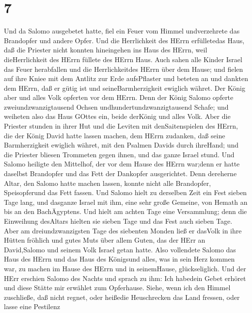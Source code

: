 \hypertarget{section-6}{%
\section{7}\label{section-6}}

 Und da Salomo ausgebetet hatte, fiel ein Feuer vom Himmel
undverzehrete das Brandopfer und andere Opfer. Und die Herrlichkeit des
HErrn erfülletedas Haus,  daß die Priester nicht konnten
hineingehen ins Haus des HErrn, weil dieHerrlichkeit des HErrn füllete
des HErrn Haus.  Auch sahen alle Kinder Israel das Feuer
herabfallen und die Herrlichkeitdes HErrn über dem Hause; und fielen auf
ihre Kniee mit dem Antlitz zur Erde aufsPflaster und beteten an und
dankten dem HErrn, daß er gütig ist und seineBarmherzigkeit ewiglich
währet.  Der König aber und alles Volk opferten vor dem
HErrn.  Denn der König Salomo opferte zweiundzwanzigtausend
Ochsen undhundertundzwanzigtausend Schafe; und weiheten also das Haus
GOttes ein, beide derKönig und alles Volk.  Aber die
Priester stunden in ihrer Hut und die Leviten mit denSaitenspielen des
HErrn, die der König David hatte lassen machen, dem HErrn zudanken, daß
seine Barmherzigkeit ewiglich währet, mit den Psalmen Davids durch
ihreHand; und die Priester bliesen Trommeten gegen ihnen, und das ganze
Israel stund.  Und Salomo heiligte den Mittelhof, der vor
dem Hause des HErrn war;denn er hatte daselbst Brandopfer und das Fett
der Dankopfer ausgerichtet. Denn dereherne Altar, den Salomo hatte
machen lassen, konnte nicht alle Brandopfer, Speisopferund das Fett
fassen.  Und Salomo hielt zu derselben Zeit ein Fest sieben
Tage lang, und dasganze Israel mit ihm, eine sehr große Gemeine, von
Hemath an bis an den BachÄgyptens.  Und hielt am achten Tage
eine Versammlung; denn die Einweihung desAltars hielten sie sieben Tage
und das Fest auch sieben Tage.  Aber am dreiundzwanzigsten
Tage des siebenten Monden ließ er dasVolk in ihre Hütten fröhlich und
gutes Muts über allem Guten, das der HErr an David,Salomo und seinem
Volk Israel getan hatte.  Also vollendete Salomo das Haus
des HErrn und das Haus des Königsund alles, was in sein Herz kommen war,
zu machen im Hause des HErrn und in seinemHause, glückseliglich.
 Und der HErr erschien Salomo des Nachts und sprach zu ihm:
Ich habedein Gebet erhöret und diese Stätte mir erwählet zum Opferhause.
 Siehe, wenn ich den Himmel zuschließe, daß nicht regnet,
oder heißedie Heuschrecken das Land fressen, oder lasse eine Pestilenz
